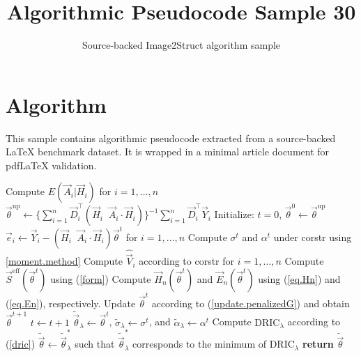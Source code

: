 \documentclass[11pt]{article}
\title{Algorithmic Pseudocode Sample 30}
\author{Source-backed Image2Struct algorithm sample}
\date{}
\begin{document}
\maketitle
\section{Algorithm}
This sample contains algorithmic pseudocode extracted from a source-backed LaTeX benchmark dataset. It is wrapped in a minimal article document for pdfLaTeX validation.

\begin{algorithm}[htbp]
\caption{Source-backed algorithmic procedure}
\begin{algorithm}
\caption{Penalized G-estimation algorithm}\begin{algorithmic}[1]
\State Compute $E(\vec A_i|\vec H_i)$ for $i=1,\ldots,n$ 
\State $\vec\theta^{\text{up}} \gets \{\sum_{i=1}^n\vec D_i^\top(\vec H_i\;\;\vec A_i\cdot\vec H_i)\}^{-1}\sum_{i=1}^n\vec D_i^\top \vec Y_i$ 
\State Initialize: $t = 0$, $\vec\theta^0 \gets \vec\theta^{\text{up}}$
\Repeat
\State $\vec e_i \gets \vec Y_i - (\vec H_i\;\;\vec A_i\cdot\vec H_i)\vec\theta^t$ for $i=1,\ldots,n$%
\State Compute $\sigma^t$ and $\alpha^t$ under corstr using \ref{moment.method} 
\State Compute $\hat{\vec V}_i$ according to corstr for $i=1,\ldots,n$ 
\State Compute $\vec S^{\text{eff}}(\vec\theta^t)$ using (\ref{form})
\State Compute $\vec H_n(\vec\theta^t)$ and $\vec E_n(\vec\theta^t)$ using (\ref{eq.Hn}) and (\ref{eq.En}), respectively.
\State Update $\vec\theta^{t}$ according to (\ref{update.penalizedG}) and obtain $\vec\theta^{t+1}$
\State $t \gets t+1$
\State $\tilde{\vec\theta}_\lambda \gets \vec\theta^t$, $\tilde{\sigma}_\lambda \gets \sigma^t$, and $\tilde{\alpha}_\lambda \gets \alpha^t$
\State Compute $\text{DRIC}_{\lambda}$ according to (\ref{dric})
\EndFor
\State $\tilde{\vec\theta} \gets \tilde{\vec\theta}_\lambda^*$ such that $\tilde{\vec\theta}_\lambda^*$ corresponds to the minimum of $\text{DRIC}_{\lambda}$
\State \textbf{return} $\tilde{\vec\theta}$
\EndProcedure
\end{algorithmic}
\end{algorithm}
\end{algorithm}
\end{document}
